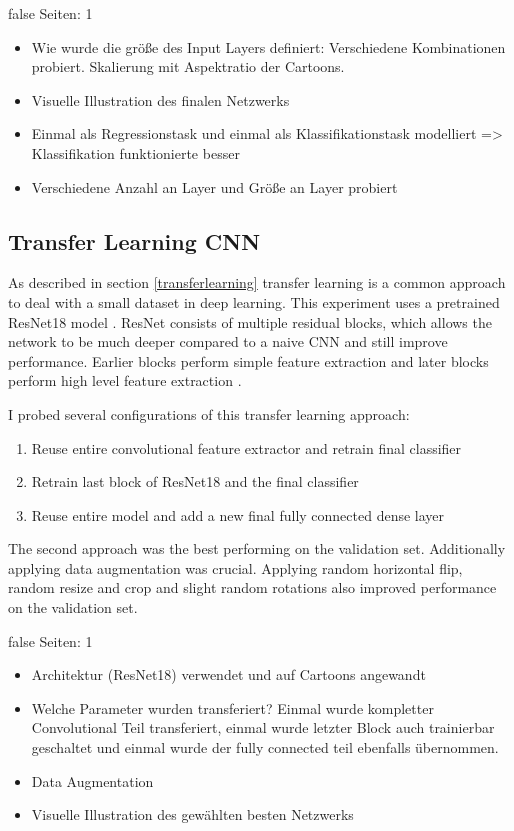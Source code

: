 \documentclass[draft,final,oneside]{vutinfth} %
\begin{document}
\if false
Seiten: 1

\begin{itemize}
\item Wie wurde die größe des Input Layers definiert: Verschiedene Kombinationen probiert. Skalierung mit Aspektratio der Cartoons. 
\item Visuelle Illustration des finalen Netzwerks
\item Einmal als Regressionstask und einmal als Klassifikationstask modelliert => Klassifikation funktionierte besser
\item Verschiedene Anzahl an Layer und Größe an Layer probiert
\end{itemize}

\fi

\subsection{Transfer Learning CNN}

As described in section \ref{transferlearning} transfer learning is a common approach to deal with a small dataset in deep learning. This experiment uses a pretrained ResNet18 model \cite{resnet}. ResNet consists of multiple residual blocks, which allows the network to be much deeper compared to a naive CNN and still improve performance. Earlier blocks perform simple feature extraction and later blocks perform high level feature extraction \cite{resnet}. 

I probed several configurations of this transfer learning approach:

\begin{enumerate}
\item Reuse entire convolutional feature extractor and retrain final classifier
\item Retrain last block of ResNet18 and the final classifier
\item Reuse entire model and add a new final fully connected dense layer
\end{enumerate}

The second approach was the best performing on the validation set. Additionally applying data augmentation was crucial. Applying random horizontal flip, random resize and crop and slight random rotations also improved performance on the validation set.

\if false
Seiten: 1

\begin{itemize}
\item Architektur (ResNet18) verwendet und auf Cartoons angewandt
\item Welche Parameter wurden transferiert? Einmal wurde kompletter Convolutional Teil transferiert, einmal wurde letzter Block auch trainierbar geschaltet und einmal wurde der fully connected teil ebenfalls übernommen.
\item Data Augmentation
\item Visuelle Illustration des gewählten besten Netzwerks

\end{itemize}
\fi
\end{document}
